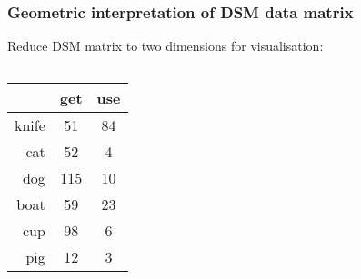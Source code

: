 \begin{frame}
  \frametitle{Geometric interpretation of DSM data matrix}

  Reduce DSM matrix to two dimensions for visualisation:

  \gap[1]
  \begin{columns}[c]
    \begin{column}{3cm}
      \begin{tabular}{r | cc}
          &  get & use  \\
    \midrule
    knife &  51  & 84   \\
    cat   &  52  &  4   \\
    dog   & 115  & 10   \\
    boat  &  59  & 23   \\
    cup   &  98  &  6   \\
    pig   &  12  &  3 
      \end{tabular}
    \end{column}
    \begin{column}{6cm}
    \end{column}
  \end{columns}
\end{frame}


